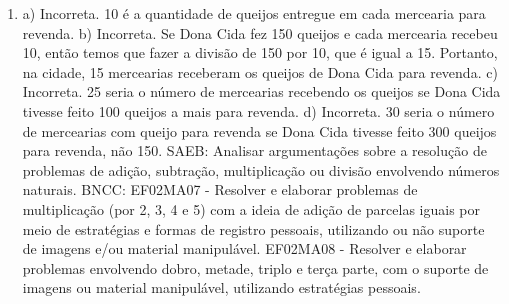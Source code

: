 \begin{enumerate}
\item
a) Incorreta. 10 é a quantidade de queijos entregue em cada
mercearia para revenda.
b) Incorreta. Se Dona Cida fez 150 queijos e cada mercearia recebeu 10,
então temos que fazer a divisão de 150 por 10, que é igual a 15.
Portanto, na cidade, 15 mercearias receberam os queijos de Dona Cida para
revenda.
c) Incorreta. 25 seria o número de mercearias recebendo os queijos se Dona Cida
tivesse feito 100 queijos a mais para revenda.
d) Incorreta. 30 seria o número de mercearias com queijo para revenda se Dona Cida
tivesse feito 300 queijos para revenda, não 150.
SAEB: Analisar argumentações sobre a resolução de problemas de
adição, subtração, multiplicação ou divisão envolvendo números naturais.
BNCC: EF02MA07 - Resolver e elaborar problemas de multiplicação (por 2,
3, 4 e 5) com a ideia de adição de parcelas iguais por meio de
estratégias e formas de registro pessoais, utilizando ou não suporte de
imagens e/ou material manipulável. EF02MA08 - Resolver e elaborar
problemas envolvendo dobro, metade, triplo e terça parte, com o suporte
de imagens ou material manipulável, utilizando estratégias pessoais.
\end{enumerate}